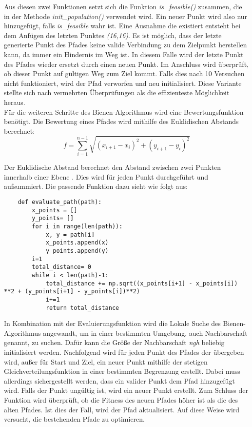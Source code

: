 Aus diesen zwei Funktionen setzt sich die Funktion \emph{is\_feasible()} zusammen, die in der Methode \emph{init\_population()} verwendet wird. Ein neuer Punkt wird also nur hinzugefügt, falls \emph{is\_feasible} wahr ist. Eine Ausnahme die existiert entsteht bei dem Anfügen des letzten Punktes \emph{(16,16)}. Es ist möglich, dass der letzte generierte Punkt des Pfades keine valide Verbindung zu dem Zielpunkt herstellen kann, da immer ein Hindernis im Weg ist. In diesem Falle wird der letzte Punkt des Pfades wieder ersetzt durch einen neuen Punkt. Im Anschluss wird überprüft, ob dieser Punkt auf gültigen Weg zum Ziel kommt. Falls dies nach 10 Versuchen nicht funktioniert, wird der Pfad verworfen und neu initialisiert. Diese Variante stellte sich nach vermehrten Überprüfungen als die effizienteste Möglichkeit heraus.\\

Für die weiteren Schritte des Bienen-Algorithmus wird eine Bewertungsfunktion benötigt. Die Bewertung eines Pfades wird mithilfe des Euklidischen Abstands berechnet:
\[f = \sum_{i=1}^{n-1} \sqrt{(x_{i+1} - x_i)^2 + (y_{i+1} - y_i)^2}\]

Der Euklidische Abstand berechnet den Abstand zwischen zwei Punkten innerhalb einer Ebene \cite{Friedrich2019}. Dies wird für jeden Punkt durchgeführt und aufsummiert. Die passende Funktion dazu sieht wie folgt aus:

\begin{verbatim}
    def evaluate_path(path):
        x_points = []
        y_points= []
        for i in range(len(path)):
            x, y = path[i]
            x_points.append(x)
            y_points.append(y)
        i=1
        total_distance= 0
        while i < len(path)-1:
            total_distance += np.sqrt((x_points[i+1] - x_points[i]) **2 + (y_points[i+1] - y_points[i])**2)
            i+=1
            return total_distance
\end{verbatim}
\vspace*{-3mm}
\vspace*{3mm}

In Kombination mit der Evaluierungsfunktion wird die Lokale Suche des Bienen-Algorithmus angewandt, um in einer bestimmten Umgebung, auch Nachbarschaft genannt, zu suchen. Dafür kann die Größe der Nachbarschaft \emph{ngh} beliebig initialisiert werden. Nachfolgend wird für jeden Punkt des Pfades der übergeben wird, außer für Start und Ziel, ein neuer Punkt mithilfe der stetigen Gleichverteilungsfunktion in einer bestimmten Begrenzung erstellt. Dabei muss allerdings sichergestellt werden, dass ein valider Punkt dem Pfad hinzugefügt wird. Falls der Punkt ungültig ist, wird ein neuer Punkt erstellt. Zum Schluss der Funktion wird überprüft, ob die Fitness des neuen Pfades höher ist als die des alten Pfades. Ist dies der Fall, wird der Pfad aktualisiert. Auf diese Weise wird versucht, die bestehenden Pfade zu optimieren.   


